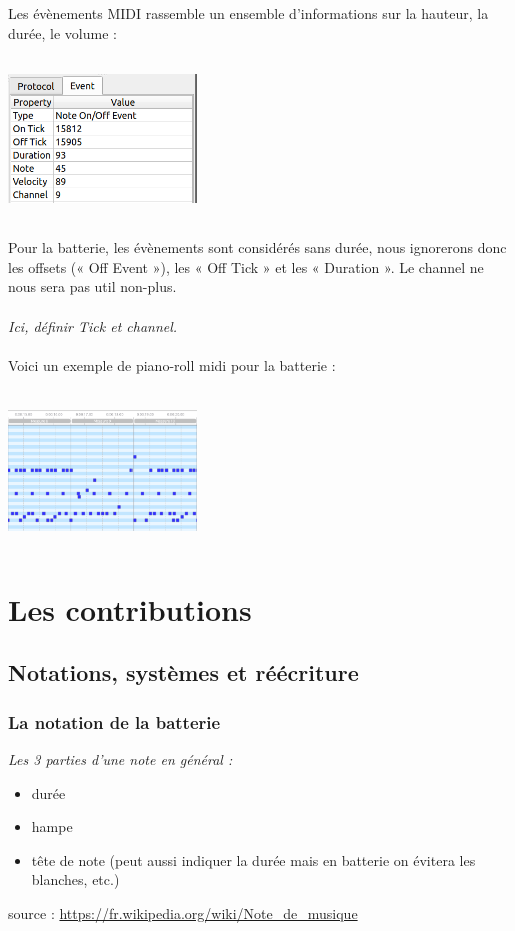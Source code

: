 Les évènements MIDI rassemble un ensemble d’informations sur la hauteur, la durée, le volume :\\\\
\includegraphics[height=40mm, width=50mm]{z_images/2_midi/representation_numerique_1.png}\\\\
Pour la batterie, les évènements sont considérés sans durée, nous ignorerons donc les offsets (« Off Event »), les « Off Tick » et les « Duration ». Le channel ne nous sera pas util non-plus.\\\\
\textit{Ici, définir Tick et channel.}\\\\
Voici un exemple de piano-roll midi pour la batterie :\\\\
\includegraphics[height=40mm, width=50mm]{z_images/2_midi/representation_numerique_0.png}
\section{Les contributions}
\subsection{Notations, systèmes et réécriture}
\subsubsection{La notation de la batterie}
\textit{Les 3 parties d’une note en général :}
\begin{itemize}
	\item durée
	\item hampe
	\item tête de note (peut aussi indiquer la durée mais en batterie on évitera les blanches, etc.)
\end{itemize}
source : \url{https://fr.wikipedia.org/wiki/Note_de_musique}

